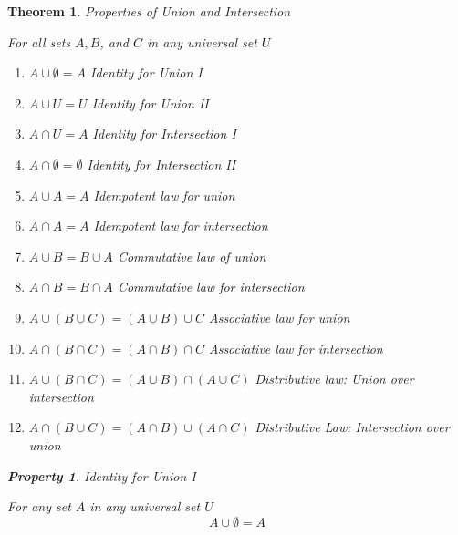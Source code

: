 \documentclass{book}
\newtheorem{theorem}{Theorem}[section]
\newtheorem{property}{Property}[theorem]
\theoremstyle{definition}
\theoremstyle{remark}
\begin{document}
\newpage
\begin{theorem}
Properties of Union and Intersection \\

    \begin{tcolorbox}
        For all sets $A, B$, and $C$ in any universal set $U$ \\
    
        \begin{enumerate}
            \item $A \cup \emptyset = A$ \textit{Identity for Union I} %
            \item $A \cup U = U$ \textit{Identity for Union II} %
            \item $A \cap U = A$ \textit{Identity for Intersection I} %
            \item $A \cap \emptyset = \emptyset$ \textit{Identity for Intersection II}  %
            \item $A \cup A = A$ \textit{Idempotent law for union} %
            \item $A \cap A = A$ \textit{Idempotent law for intersection} %
            
            \item $A \cup B = B \cup A$ \textit{Commutative law of union} %
            \item $A \cap B = B \cap A$ \textit{Commutative law for intersection} %
            
            \item $A \cup (B \cup C) = (A \cup B) \cup C$ \textit{Associative law for union} %
            \item $A \cap (B \cap C) = (A \cap B) \cap C$ \textit{Associative law for intersection} %
            
            \item $A \cup (B \cap C) = (A \cup B) \cap (A \cup C)$ \textit{Distributive law: Union over intersection} %
            \item $A \cap (B \cup C) = (A \cap B) \cup (A \cap C)$ \textit{Distributive Law: Intersection over union} %
        \end{enumerate}
    \end{tcolorbox}


    \newpage
    \begin{property}
    Identity for Union I \\
        \begin{tcolorbox}
            For any set $A$ in any universal set $U$
                \begin{equation*}
                    A \cup \emptyset = A
                \end{equation*}
        \end{tcolorbox}
    

\end{property}
\end{theorem}
\end{document}
